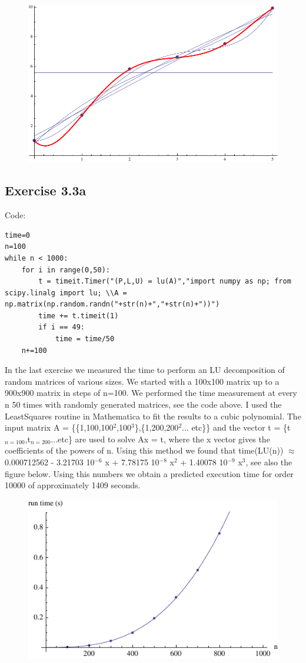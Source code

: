 \documentclass[10pt,a4paper]{article}
\begin{document}
\begin{figure}[H]
\centering
\includegraphics[scale=0.5]{3_1.pdf}
\end{figure}


\subsection*{Exercise 3.3a}

Code:
\begin{lstlisting}
time=0
n=100
while n < 1000:
    for i in range(0,50):
        t = timeit.Timer("(P,L,U) = lu(A)","import numpy as np; from scipy.linalg import lu; \\A = np.matrix(np.random.randn("+str(n)+","+str(n)+"))")
        time += t.timeit(1)
        if i == 49:
            time = time/50
    n+=100
\end{lstlisting}

\noindent In the last exercise we measured the time to perform an LU decomposition of random matrices of various sizes. We started with a 100x100 matrix up to a 900x900 matrix in steps of n=100. We performed the time measurement at every n 50 times with randomly generated matrices, see the code above. I used the LeastSquares routine in Mathematica to fit the results to a cubic polynomial. The input matrix A = \{\{1,100,100$^2$,100$^3$\},\{1,200,200$^{2}$... etc\}\} and the vector t = \{t$_{n=100}$,t$_{n=200}$...etc\} are used to solve Ax = t, where the x vector gives the coefficients of the powers of n. Using this method we found that time(LU(n)) $\approx$ 0.000712562 - 3.21703 10$^{-6}$ x + 7.78175 10$^{-8}$ x$^2$ + 1.40078 10$^{-9}$ x$^3$, see also the figure below. Using this numbers we obtain a predicted execution time for order 10000 of approximately 1409 seconds.

\begin{figure}[H]
\centering
\includegraphics[scale=1.0]{3_3.pdf}
\end{figure}
\end{document}
